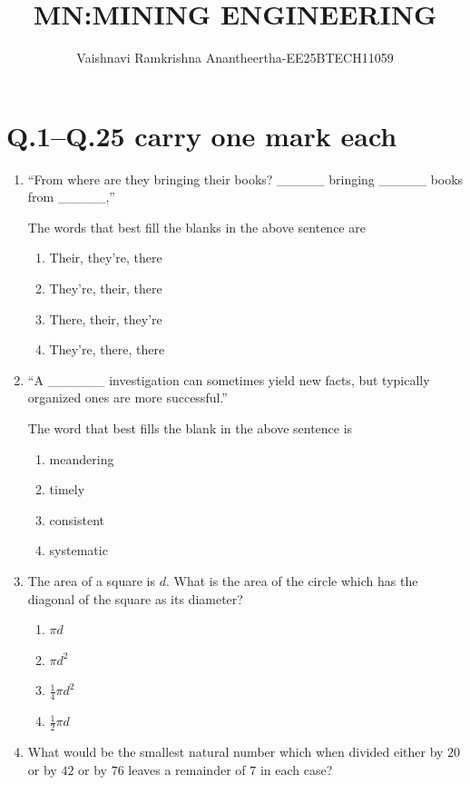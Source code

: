 \documentclass[journal,12pt,onecolumn]{IEEEtran}
\title{\Huge MN:MINING ENGINEERING}
\author{Vaishnavi Ramkrishna Anantheertha-EE25BTECH11059}
\theoremstyle{remark}
\begin{document}
\maketitle

\section*{Q.1--Q.25 carry one mark each}
\begin{enumerate}
\item ``From where are they bringing their books? \_\_\_\_\_ bringing \_\_\_\_\_ books from \_\_\_\_\_,''

The words that best fill the blanks in the above sentence are  

\begin{enumerate}[label=(\Alph*)]
    \item Their, they're, there
    \item They're, their, there
    \item There, their, they're
    \item They're, there, there
\end{enumerate}
\item ``A \_\_\_\_\_\_ investigation can sometimes yield new facts, but typically organized ones are more successful.''  

The word that best fills the blank in the above sentence is  
\hfill{}
\begin{multicols}{4}
\begin{enumerate}
\item  meandering 
\item  timely
\item consistent
\item systematic
\end{enumerate}
\end{multicols}

\item The area of a square is $d$. What is the area of the circle which has the diagonal of the square as its diameter?  

\hfill{}
\begin{multicols}{4}
\begin{enumerate}
    \item $\pi d$
    \item $\pi d^{2}$ \
    \item $\frac{1}{4}\pi d^{2}$  
    \item $\tfrac{1}{2}\pi d$
\end{enumerate}
\end{multicols}
\item What would be the smallest natural number which when divided either by $20$ or by $42$ or by $76$ leaves a remainder of $7$ in each case?


\end{enumerate}
\end{document}
